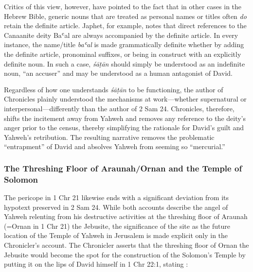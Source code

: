  Critics of this view, however, have pointed to the fact that in other cases in the Hebrew Bible, generic nouns that are treated as personal names or titles often \emph{do} retain the definite article.\autocites[114--117]{japhet2009}[370--390]{japhet1993} Japhet, for example, notes that direct references to the Canaanite deity Baʿal are always accompanied by the definite article. In every instance, the name/title \emph{baʿal} is made grammatically definite whether by adding the definite article, pronominal suffixes, or being in construct with an explicitly definite noun.\autocites[115]{japhet2009}[citing][§126d]{gkc} In such a case, \emph{śāṭān} should simply be understood as an indefinite noun, ``an accuser'' and may be understood as a human antagonist of David.\autocites{stokes_jbl2009}[114--117]{japhet2009}[370--390]{japhet1993} 

 Regardless of how one understands \emph{śāṭān} to be functioning, the author of Chronicles plainly understood the mechanisms at work---whether supernatural or interpersonal---differently than the author of 2 Sam 24. Chronicles, therefore, shifts the incitement away from Yahweh and removes any reference to the deity's anger prior to the census, thereby simplifying the rationale for David's guilt and Yahweh's retribution. The resulting narrative removes the problematic ``entrapment'' of David and absolves Yahweh from seeming so ``mercurial.'' \autocite[4]{rollston_keith-stuckenbruck2016} 

 \hypertarget{the-threshing-floor-of-araunahornan-and-the-temple-of-solomon}{%
 \subsubsection{The Threshing Floor of Araunah/Ornan and the Temple of Solomon}\label{the-threshing-floor-of-araunahornan-and-the-temple-of-solomon}} 

 The pericope in 1 Chr 21 likewise ends with a significant deviation from its hypotext preserved in 2 Sam 24. While both accounts describe the angel of Yahweh relenting from his destructive activities at the threshing floor of Araunah (=Ornan in 1 Chr 21) the Jebusite, the significance of the site as the future location of the Temple of Yahweh in Jerusalem is made explicit only in the Chronicler's account. The Chronicler asserts that the threshing floor of Ornan the Jebusite would become the spot for the construction of the Solomon's Temple by putting it on the lips of David himself in 1 Chr 22:1, stating : 

